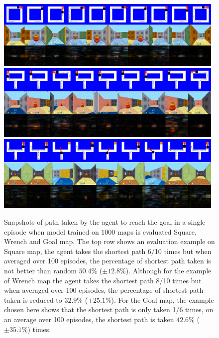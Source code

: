 \begin{figure}[h]
\def\vertspace{1ex}
%
\includegraphics[width=0.98\textwidth,trim=0 672pt 0 0,clip]{./exp-results/training-1000_on_square_map.png}%
\vspace{\vertspace}
%
\includegraphics[width=0.98\textwidth,trim=0 672pt 0 0,clip]{./exp-results/training-1000_on_wrench_map.png}%
\vspace{\vertspace}
%
\includegraphics[width=0.98\textwidth,trim=0 672pt 0 0,clip]{./exp-results/training-1000_on_goal_map.png}%
\caption{Snapshots of path taken by the agent to reach the goal in a single episode when model trained on 1000 maps is evaluated Square, Wrench and Goal map.
  The top row shows an evaluation example on Square map, the agent takes the shortest path 6/10 times but when averaged over 100 episodes, the percentage of shortest path taken is not better than random $50.4$\% ($\pm 12.8$\%).
  Although for the example of Wrench map the agent takes the shortest path 8/10 times but when averaged over 100 episodes, the percentage of shortest path taken is reduced to $32.9$\% ($\pm 25.1$\%).
 For the Goal map, the example chosen here shows that the shortest path is only taken 1/6 times, on an average over 100 episodes, the shortest path is taken $42.6$\% ($\pm 35.1$\%) times.
}
\label{fig:planning-qualitative}
\end{figure}
